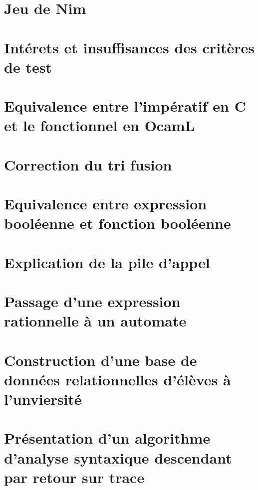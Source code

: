 \chapter{Jeu de Nim} \label{D45}


\chapter{Intérets et insuffisances des critères de test}\label{D46}


\chapter{Equivalence entre l'impératif en C et le fonctionnel en OcamL} \label{D47}


\chapter{Correction du tri fusion} \label{D48}


\chapter{Equivalence entre expression booléenne et fonction booléenne} \label{D49}


\chapter{Explication de la pile d'appel} \label{D50}


\chapter{Passage d'une expression rationnelle à un automate} \label{D51}


\chapter{Construction d'une base de données relationnelles d'élèves à l'unviersité} \label{D52}


\chapter{Présentation d'un algorithme d'analyse syntaxique descendant par retour sur trace} \label{D53}


